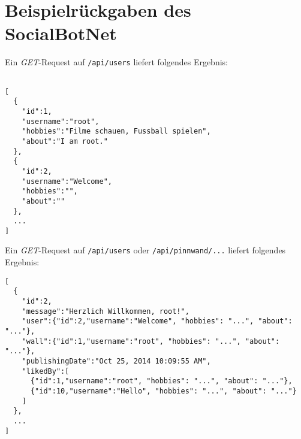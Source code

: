 \documentclass[parskip=half*]{scrartcl}
\begin{document}
\newpage
\section*{Beispielrückgaben des SocialBotNet}

Ein \emph{GET}-Request auf \lstinline{/api/users} liefert folgendes Ergebnis:
\begin{lstlisting}

[
  {
    "id":1,
    "username":"root",
    "hobbies":"Filme schauen, Fussball spielen",
    "about":"I am root."
  },
  {
    "id":2,
    "username":"Welcome",
    "hobbies":"",
    "about":""
  },
  ...
]
\end{lstlisting}


Ein \emph{GET}-Request auf \lstinline{/api/users} oder \lstinline{/api/pinnwand/...} liefert folgendes Ergebnis:
\begin{lstlisting}
[
  {
    "id":2,
    "message":"Herzlich Willkommen, root!",
    "user":{"id":2,"username":"Welcome", "hobbies": "...", "about": "..."},
    "wall":{"id":1,"username":"root", "hobbies": "...", "about": "..."},
    "publishingDate":"Oct 25, 2014 10:09:55 AM",
    "likedBy":[
      {"id":1,"username":"root", "hobbies": "...", "about": "..."},
      {"id":10,"username":"Hello", "hobbies": "...", "about": "..."}
    ]
  },
  ...
]
\end{lstlisting}
\end{document}
